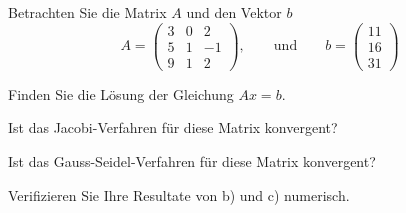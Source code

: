 Betrachten Sie die Matrix $A$ und den Vektor $b$
\[
A=\begin{pmatrix}
   3&  0&  2 \\
   5&  1& -1 \\
   9&  1&  2
\end{pmatrix},
\qquad\text{und}\qquad
b
=
\begin{pmatrix}
11\\16\\31
\end{pmatrix}
\]
\begin{teilaufgaben}
\item
Finden Sie die Lösung der Gleichung $Ax=b$.
\item
Ist das Jacobi-Verfahren für diese Matrix konvergent?
\item
Ist das Gauss-Seidel-Verfahren für diese Matrix konvergent?
\item
Verifizieren Sie Ihre Resultate von b) und c) numerisch.
\end{teilaufgaben}


